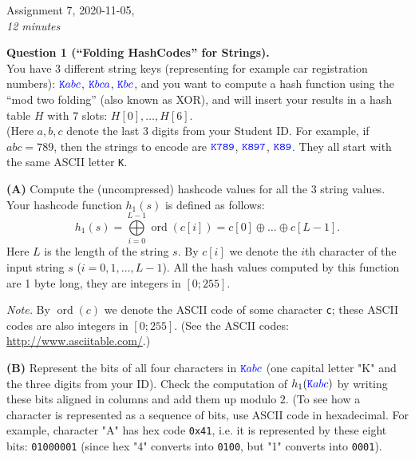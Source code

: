 \documentclass[a4paper,12pt]{article}
\begin{document}

\thispagestyle{empty}

\begin{center}
{\Large Assignment 7, 2020-11-05,}\\
{\em 12 minutes} 
\end{center}

\noindent


\vspace{10pt}
{\bf Question 1 (``Folding HashCodes'' for Strings).}\\
You have $3$ different string keys (representing for example car registration numbers): 
$\textcolor{blue}{\mathtt{K}abc}$, $\textcolor{blue}{\mathtt{K}bca}$, 
$\textcolor{blue}{\mathtt{K}bc}$, and you want to compute 
a hash function using the ``mod two folding'' (also known as XOR), and 
will insert your results in a hash table $H$ with $7$ slots: $H[0],\ldots,H[6]$.\\
(Here $a,b,c$ denote the last $3$ digits from your Student ID. 
For example, if $abc = 789$, then the strings to encode are 
$\textcolor{blue}{\mathtt{K789}}$, 
$\textcolor{blue}{\mathtt{K897}}$, 
$\textcolor{blue}{\mathtt{K89}}$. They all start with the same ASCII letter {\tt K}. 

{\bf (A)} Compute the (uncompressed) hashcode values for all the $3$ string values.  
Your hashcode function $h_1(s)$ is defined as follows:
$$h_1(s) = \bigoplus\limits_{i=0}^{L-1} \operatorname{ord}(c[i]) = c[0] \oplus \ldots \oplus c[L-1].$$
Here $L$ is the length of the string $s$.
By $c[i]$ we denote the $i$th character of the input string $s$ ($i = 0,1,\ldots,L-1$).
All the hash values computed by this function are 1 byte long, they are 
integers in $[0;255]$.  

{\em Note.} By $\operatorname{ord}(c)$ we denote
the ASCII code of some character {\tt c}; these ASCII codes are also integers in $[0;255]$. 
(See the ASCII codes: \url{http://www.asciitable.com/}.) 

\vspace{10pt}
{\bf (B)} Represent the bits of all four characters in 
$\textcolor{blue}{\mathtt{K}abc}$ (one capital letter "K" and the three digits from your ID). 
Check the computation of $h_1(\textcolor{blue}{\mathtt{K}abc})$ by writing these bits 
aligned in columns and add them up modulo $2$. 
(To see how a character is represented as a sequence of bits, use ASCII code in hexadecimal. 
For example, character "A" has hex code {\tt 0x41}, i.e. it is represented by 
these eight bits: {\tt 01000001} (since hex "4" converts into {\tt 0100}, but "1" converts into 
{\tt 0001}). 
\end{document}
